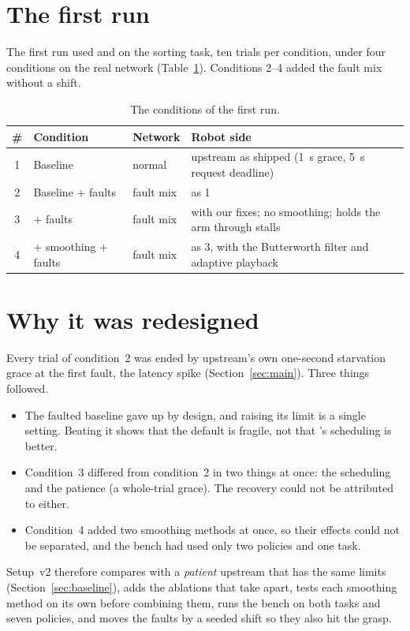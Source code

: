 
\section{The first run}\label{sec:firstrun}

The first run used \smolvla{} and \groot{} on the sorting task, ten trials per condition, under four conditions on the
real network (Table~\ref{tab:conditions1}). Conditions 2--4 added the fault mix without a shift.

\begin{table}[htbp]
  \centering
  \small
  \begin{tabularx}{\textwidth}{c l l X}
    \toprule
    \# & Condition & Network & Robot side \\
    \midrule
    1 & Baseline & normal & upstream as shipped (1~s grace, 5~s request deadline) \\
    2 & Baseline + faults & fault mix & as 1 \\
    3 & \drtc{} + faults & fault mix & \drtc{} with our fixes; no smoothing; holds the arm through stalls \\
    4 & \drtc{} + smoothing + faults & fault mix & as 3, with the Butterworth filter and adaptive playback \\
    \bottomrule
  \end{tabularx}
  \caption{The conditions of the first run.}\label{tab:conditions1}
\end{table}

\section{Why it was redesigned}\label{sec:redesign}

Every trial of condition~2 was ended by upstream's own one-second starvation grace at the first fault, the latency
spike (Section~\ref{sec:main}). Three things followed.
\begin{itemize}
\item The faulted baseline gave up by design, and raising its limit is a single setting. Beating it shows that the
      default is fragile, not that \drtc's scheduling is better.
\item Condition~3 differed from condition~2 in two things at once: the scheduling and the patience (a whole-trial
      grace). The recovery could not be attributed to either.
\item Condition~4 added two smoothing methods at once, so their effects could not be separated, and the bench had used
      only two policies and one task.
\end{itemize}
Setup~v2 therefore compares \drtc{} with a \emph{patient} upstream that has the same limits (Section~\ref{sec:baseline}),
adds the ablations that take \drtc{} apart, tests each smoothing method on its own before combining them, runs the bench
on both tasks and seven policies, and moves the faults by a seeded shift so they also hit the grasp.

